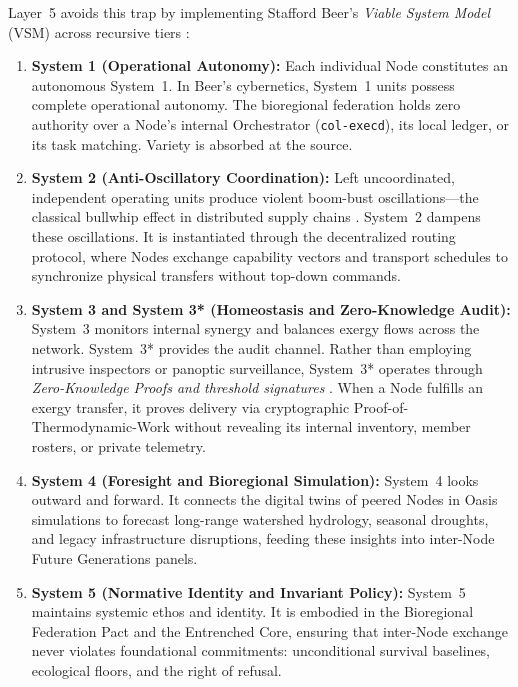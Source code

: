 Layer~5 avoids this trap by implementing Stafford Beer's \textit{Viable System Model} (VSM) across recursive tiers \parencite{beer1972, beer1979}:
\begin{enumerate}
    \item \textbf{System 1 (Operational Autonomy):} Each individual Node constitutes an autonomous System~1. In Beer's cybernetics, System~1 units possess complete operational autonomy. The bioregional federation holds zero authority over a Node's internal Orchestrator (\texttt{col-execd}), its local ledger, or its task matching. Variety is absorbed at the source.
    \item \textbf{System 2 (Anti-Oscillatory Coordination):} Left uncoordinated, independent operating units produce violent boom-bust oscillations—the classical bullwhip effect in distributed supply chains \parencite{forrester1961}. System~2 dampens these oscillations. It is instantiated through the decentralized routing protocol, where Nodes exchange capability vectors and transport schedules to synchronize physical transfers without top-down commands.
    \item \textbf{System 3 and System 3* (Homeostasis and Zero-Knowledge Audit):} System~3 monitors internal synergy and balances exergy flows across the network. System~3* provides the audit channel. Rather than employing intrusive inspectors or panoptic surveillance, System~3* operates through \textit{Zero-Knowledge Proofs and threshold signatures} \parencite{rose2020zero}. When a Node fulfills an exergy transfer, it proves delivery via cryptographic Proof-of-Thermodynamic-Work without revealing its internal inventory, member rosters, or private telemetry.
    \item \textbf{System 4 (Foresight and Bioregional Simulation):} System~4 looks outward and forward. It connects the digital twins of peered Nodes in Oasis simulations to forecast long-range watershed hydrology, seasonal droughts, and legacy infrastructure disruptions, feeding these insights into inter-Node Future Generations panels.
    \item \textbf{System 5 (Normative Identity and Invariant Policy):} System~5 maintains systemic ethos and identity. It is embodied in the Bioregional Federation Pact and the Entrenched Core, ensuring that inter-Node exchange never violates foundational commitments: unconditional survival baselines, ecological floors, and the right of refusal.
\end{enumerate}

